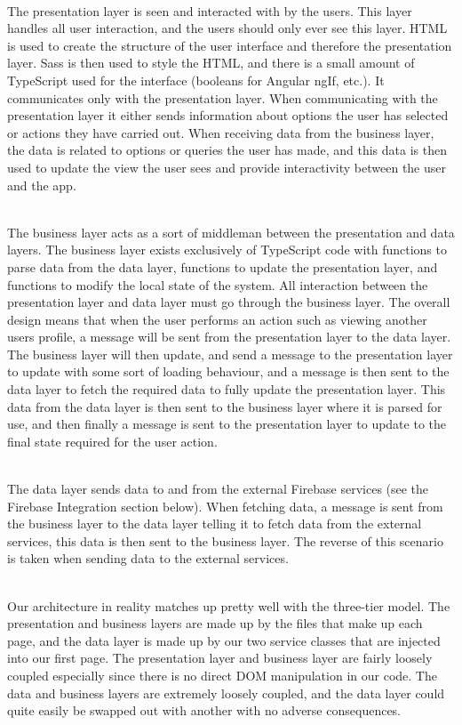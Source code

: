 \documentclass[a4paper, 11pt]{article}
\begin{document}
~\\
The presentation layer is seen and interacted with by the users. This layer handles all user interaction, and the users should only ever see this layer. HTML is used to create the structure of the user interface and therefore the presentation layer. Sass is then used to style the HTML, and there is a small amount of TypeScript used for the interface (booleans for Angular ngIf, etc.). It communicates only with the presentation layer. When communicating with the presentation layer it either sends information about options the user has selected or actions they have carried out. When receiving data from the business layer, the data is related to options or queries the user has made, and this data is then used to update the view the user sees and provide interactivity between the user and the app.

~\\
The business layer acts as a sort of middleman between the presentation and data layers. The business layer exists exclusively of TypeScript code with functions to parse data from the data layer, functions to update the presentation layer, and functions to modify the local state of the system. All interaction between the presentation layer and data layer must go through the business layer. The overall design means that when the user performs an action such as viewing another users profile, a message will be sent from the presentation layer to the data layer. The business layer will then update, and send a message to the presentation layer to update with some sort of loading behaviour, and a message is then sent to the data layer to fetch the required data to fully update the presentation layer. This data from the data layer is then sent to the business layer where it is parsed for use, and then finally a message is sent to the presentation layer to update to the final state required for the user action.

~\\
The data layer sends data to and from the external Firebase services (see the Firebase Integration section below). When fetching data, a message is sent from the business layer to the data layer telling it to fetch data from the external services, this data is then sent to the business layer. The reverse of this scenario is taken when sending data to the external services.

~\\
Our architecture in reality matches up pretty well with the three-tier model. The presentation and business layers are made up by the files that make up each page, and the data layer is made up by our two service classes that are injected into our first page. The presentation layer and business layer are fairly loosely coupled especially since there is no direct DOM manipulation in our code. The data and business layers are extremely loosely coupled, and the data layer could quite easily be swapped out with another with no adverse consequences.
\end{document}
